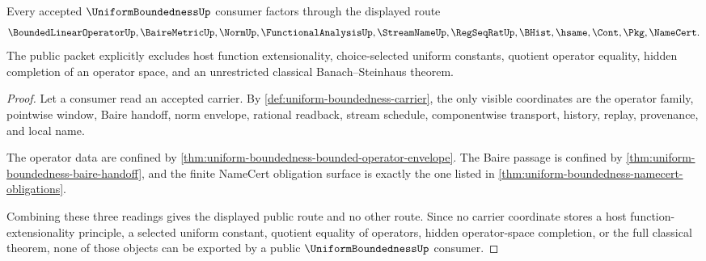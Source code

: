 \begin{theorem}
\label{thm:uniform-boundedness-public-boundary}
Every accepted $\UniformBoundednessUp$ consumer factors through the displayed route
$$
\BoundedLinearOperatorUp,\BaireMetricUp,\NormUp,\FunctionalAnalysisUp,\StreamNameUp,\RegSeqRatUp,\BHist,\hsame,\Cont,\Pkg,\NameCert .
$$
The public packet explicitly excludes host function extensionality, choice-selected uniform constants, quotient operator equality, hidden completion of an operator space, and an unrestricted classical Banach--Steinhaus theorem.
\end{theorem}
\begin{proof}
Let a consumer read an accepted carrier. By \autoref{def:uniform-boundedness-carrier}, the only visible coordinates are the operator family, pointwise window, Baire handoff, norm envelope, rational readback, stream schedule, componentwise transport, history, replay, provenance, and local name.

The operator data are confined by \autoref{thm:uniform-boundedness-bounded-operator-envelope}. The Baire passage is confined by \autoref{thm:uniform-boundedness-baire-handoff}, and the finite NameCert obligation surface is exactly the one listed in \autoref{thm:uniform-boundedness-namecert-obligations}.

Combining these three readings gives the displayed public route and no other route. Since no carrier coordinate stores a host function-extensionality principle, a selected uniform constant, quotient equality of operators, hidden operator-space completion, or the full classical theorem, none of those objects can be exported by a public $\UniformBoundednessUp$ consumer.
\end{proof}



